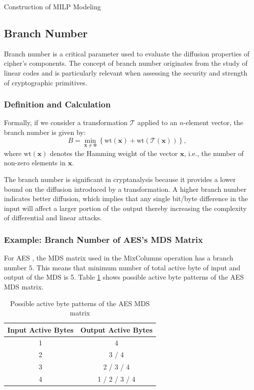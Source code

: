 \documentclass [version=final]{iacrcc}
\begin{document}
\begin{section}{Construction of MILP Modeling}

\subsection{Branch Number} \label{sec:branch}
Branch number is a critical parameter used to evaluate the diffusion properties of cipher's components. The concept of branch number originates from the study of linear codes and is particularly relevant when assessing the security and strength of cryptographic primitives.

\subsubsection{Definition and Calculation}

Formally, if we consider a transformation $\mathcal{T}$ applied to an $n$-element vector, the branch number is given by:
$$
B = \min_{\mathbf{x} \neq \mathbf{0}} \left\{ \text{wt}(\mathbf{x}) + \text{wt}(\mathcal{T}(\mathbf{x})) \right\},
$$
where $\text{wt}(\mathbf{x})$ denotes the Hamming weight of the vector $\mathbf{x}$, i.e., the number of non-zero elements in $\mathbf{x}$.

The branch number is significant in cryptanalysis because it provides a lower bound on the diffusion introduced by a transformation. A higher branch number indicates better diffusion, which implies that any single bit/byte difference in the input will affect a larger portion of the output thereby increasing the complexity of differential and linear attacks.

\subsubsection{Example: Branch Number of AES's MDS Matrix}


For AES \cite{dworkin2001advanced}, the MDS matrix used in the MixColumns operation has a branch number $5$. This means that minimum number of total active byte of input and output of the MDS is 5. Table \ref{tab:aes-mds} shows possible active byte patterns of the AES MDS matrix.

\begin{table}[h]
\centering
\begin{tabular}{|c|c|}
\hline
\textbf{Input Active Bytes} & \textbf{Output Active Bytes}           \\ \hline
1                           & 4                                      \\ \hline
2                           & 3 / 4                                   \\ \hline
3                           & 2 / 3 / 4                               \\ \hline
4                           & 1 / 2 / 3 / 4                           \\ \hline
\end{tabular} \\
\caption{Possible active byte patterns of the AES MDS matrix}
\label{tab:aes-mds}
\end{table}


\end{section}
\end{document}
